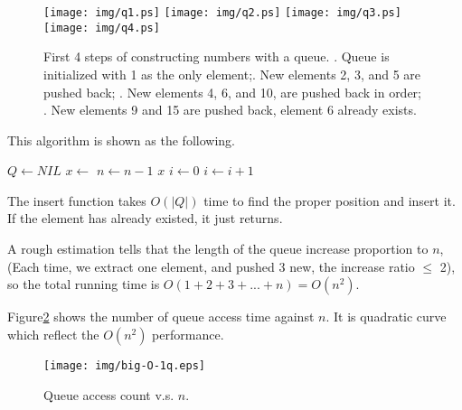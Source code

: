 \documentclass{article}
\begin{document}
\begin{figure}[htbp]
       \begin{center}
       	  \texttt{[image: img/q1.ps]}
       	  \texttt{[image: img/q2.ps]}
       	  \texttt{[image: img/q3.ps]}
       	  \texttt{[image: img/q4.ps]}
        \caption{First 4 steps of constructing numbers with a queue. . Queue is initialized with 1 as the only element;. New elements 2, 3, and 5 are pushed back; . New elements 4, 6, and 10, are pushed back in order; . New elements 9 and 15 are pushed back, element 6 already exists.} \label{fig:queues}
       \end{center}
\end{figure}

This algorithm is shown as the following.

\begin{algorithmic}[1]
  \State $Q \gets NIL$
  \State {}
    \State $x \gets$ 
    \State {}
    \State {}
    \State {}
    \State $n \gets n-1$
  \EndWhile
  \State \Return $x$
\EndFunction
\Statex
{}
  \State $i \gets 0$
    \State $i \gets i + 1$
  \EndWhile
    \State \Return
  \EndIf
  \State {}
\EndFunction
\end{algorithmic}

The insert function takes $O(|Q|)$ time to find the proper position and insert
it. If the element has already existed, it just returns.

A rough estimation tells that the length of the queue increase proportion to $n$,
(Each time, we extract one element, and pushed 3 new, the increase ratio $\leq$ 2),
so the total running time is $O(1+2+3+...+n) = O(n^2)$.

Figure\ref{fig:big-O-1q} shows the number of queue access time against $n$.
It is quadratic curve which reflect the $O(n^2)$ performance.

\begin{figure}[htbp]
       \begin{center}
       	  \texttt{[image: img/big-O-1q.eps]}
        \caption{Queue access count v.s. $n$.} \label{fig:big-O-1q}
       \end{center}
\end{figure}
\end{document}
